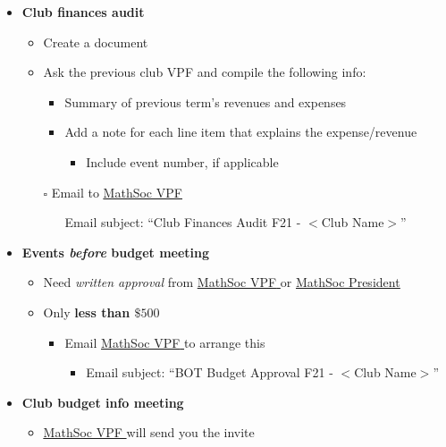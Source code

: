 \documentclass[utf8]{article}
\makeatletter
\newcommand{\termandyear}{F21 }
\newcommand{\MathSocVPF}{\href{mailto:vpf@mathsoc.uwaterloo.ca}{\underline{MathSoc VPF} }}
\newcommand{\MathSocPrez}{\href{mailto:prez@mathsoc.uwaterloo.ca}{\underline{MathSoc President} }}
\makeatother
\begin{document}
\begin{itemize}
\begin{itemize}
    \end{itemize}
    \item \textbf{Club finances audit}
    \begin{itemize}
        \item Create a document
        \item Ask the previous club VPF and compile the following info:
        \begin{itemize}
            \item Summary of previous term’s revenues and expenses
            \item Add a note for each line item that explains the expense/revenue
            \begin{itemize}
                \item Include event number, if applicable
            \end{itemize}
        \end{itemize}
        \item[$\square$] Email to \MathSocVPF 
            \begin{itemize}
                \item[\textperiodcentered] Email subject: ``Club Finances Audit \termandyear - $<$Club Name$>$''
            \end{itemize}
    \end{itemize}
    \item \textbf{Events \textit{before} budget meeting}
    \begin{itemize}
        \item Need \textit{written approval} from \MathSocVPF or \MathSocPrez
        \item Only \textbf{less than $\$500$}
        \begin{itemize}
            \item Email \MathSocVPF to arrange this
            \begin{itemize}
                \item Email subject: ``BOT Budget Approval \termandyear - $<$Club Name$>$''
            \end{itemize}
        \end{itemize}
    \end{itemize}
    \item \textbf{Club budget info meeting}
    \begin{itemize}
        \item \MathSocVPF will send you the invite
        \begin{itemize}

\end{itemize}
\end{itemize}
\end{itemize}
\end{document}

